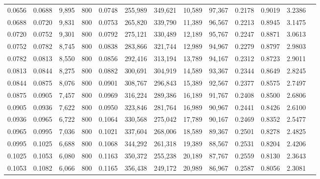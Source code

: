 \begin{tabular}{rrrrrrrrrrrrr}
0.0656 & 0.0688 &  9,895 &   800 &                                     0.0748 & 255,989 & 349,621 &  10,589 &  97,367 & 0.2178 & 0.9019 & 3.2386 \\
0.0688 & 0.0720 &  9,831 &   800 &                                     0.0753 & 265,820 & 339,790 &  11,389 &  96,567 & 0.2213 & 0.8945 & 3.1475 \\
0.0720 & 0.0752 &  9,301 &   800 &                                     0.0792 & 275,121 & 330,489 &  12,189 &  95,767 & 0.2247 & 0.8871 & 3.0613 \\
0.0752 & 0.0782 &  8,745 &   800 &                                     0.0838 & 283,866 & 321,744 &  12,989 &  94,967 & 0.2279 & 0.8797 & 2.9803 \\
0.0782 & 0.0813 &  8,550 &   800 &                                     0.0856 & 292,416 & 313,194 &  13,789 &  94,167 & 0.2312 & 0.8723 & 2.9011 \\
0.0813 & 0.0844 &  8,275 &   800 &                                     0.0882 & 300,691 & 304,919 &  14,589 &  93,367 & 0.2344 & 0.8649 & 2.8245 \\
0.0844 & 0.0875 &  8,076 &   800 &                                     0.0901 & 308,767 & 296,843 &  15,389 &  92,567 & 0.2377 & 0.8575 & 2.7497 \\
0.0875 & 0.0905 &  7,457 &   800 &                                     0.0969 & 316,224 & 289,386 &  16,189 &  91,767 & 0.2408 & 0.8500 & 2.6806 \\
0.0905 & 0.0936 &  7,622 &   800 &                                     0.0950 & 323,846 & 281,764 &  16,989 &  90,967 & 0.2441 & 0.8426 & 2.6100 \\
0.0936 & 0.0965 &  6,722 &   800 &                                     0.1064 & 330,568 & 275,042 &  17,789 &  90,167 & 0.2469 & 0.8352 & 2.5477 \\
0.0965 & 0.0995 &  7,036 &   800 &                                     0.1021 & 337,604 & 268,006 &  18,589 &  89,367 & 0.2501 & 0.8278 & 2.4825 \\
0.0995 & 0.1025 &  6,688 &   800 &                                     0.1068 & 344,292 & 261,318 &  19,389 &  88,567 & 0.2531 & 0.8204 & 2.4206 \\
0.1025 & 0.1053 &  6,080 &   800 &                                     0.1163 & 350,372 & 255,238 &  20,189 &  87,767 & 0.2559 & 0.8130 & 2.3643 \\
0.1053 & 0.1082 &  6,066 &   800 &                                     0.1165 & 356,438 & 249,172 &  20,989 &  86,967 & 0.2587 & 0.8056 & 2.3081 \\

\end{tabular}
